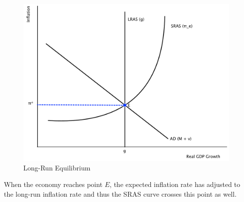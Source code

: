 \documentclass[11pt]{article}\usepackage[]{graphicx}\usepackage[]{color}
\theoremstyle{definition}
\begin{document}
\begin{figure}[H]
	\centering
	\includegraphics[scale=.40]{plot98.pdf}
	\caption{Long-Run Equilibrium}
\end{figure}

When the economy reaches point $E$, the expected inflation rate has adjusted to the long-run inflation rate and thus the SRAS curve crosses this point as well.
\end{document}
